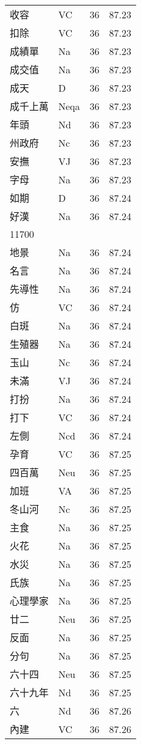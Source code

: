 \documentclass[twocolumn]{book}
\begin{document}
\begin{supertabular}{llrr}
收容 & VC & 36 &  87.23\\
扣除 & VC & 36 &  87.23\\
成績單 & Na & 36 &  87.23\\
成交值 & Na & 36 &  87.23\\
成天 & D & 36 &  87.23\\
成千上萬 & Neqa & 36 &  87.23\\
年頭 & Nd & 36 &  87.23\\
州政府 & Nc & 36 &  87.23\\
安撫 & VJ & 36 &  87.23\\
字母 & Na & 36 &  87.23\\
如期 & D & 36 &  87.24\\
好漢 & Na & 36 &  87.24\\
11700\\
地景 & Na & 36 &  87.24\\
名言 & Na & 36 &  87.24\\
先導性 & Na & 36 &  87.24\\
仿 & VC & 36 &  87.24\\
白斑 & Na & 36 &  87.24\\
生殖器 & Na & 36 &  87.24\\
玉山 & Nc & 36 &  87.24\\
未滿 & VJ & 36 &  87.24\\
打扮 & Na & 36 &  87.24\\
打下 & VC & 36 &  87.24\\
左側 & Ncd & 36 &  87.24\\
孕育 & VC & 36 &  87.25\\
四百萬 & Neu & 36 &  87.25\\
加班 & VA & 36 &  87.25\\
冬山河 & Nc & 36 &  87.25\\
主食 & Na & 36 &  87.25\\
火花 & Na & 36 &  87.25\\
水災 & Na & 36 &  87.25\\
氏族 & Na & 36 &  87.25\\
心理學家 & Na & 36 &  87.25\\
廿二 & Neu & 36 &  87.25\\
反面 & Na & 36 &  87.25\\
分句 & Na & 36 &  87.25\\
六十四 & Neu & 36 &  87.25\\
六十九年 & Nd & 36 &  87.25\\
六 & Nd & 36 &  87.26\\
內建 & VC & 36 &  87.26\\

\end{supertabular}
\end{document}
